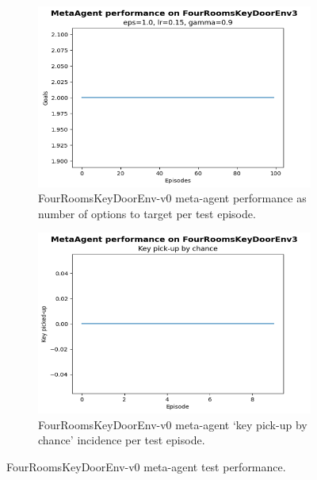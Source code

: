 \documentclass[conference]{IEEEtran}
\begin{document}
\begin{figure}[ht]
\centering
\begin{subfigure}[t]{0.45\columnwidth}
\centering
\includegraphics[width=1.0\textwidth]{img/exp_option_her_test_perf_small.png}
\caption{FourRoomsKeyDoorEnv-v0 meta-agent performance as number of options to target per test episode.}
\label{fig:exp_option_her_test_perf_small}
\end{subfigure}
\hspace{0em}
\begin{subfigure}[t]{0.45\columnwidth}
\centering
\includegraphics[width=1.0\textwidth]{img/exp_option_her_test_pick_small.png}
\caption{FourRoomsKeyDoorEnv-v0 meta-agent ‘key pick-up by chance’ incidence per test episode.}
\label{fig:exp_option_her_test_pick_small}
\end{subfigure}
\caption{FourRoomsKeyDoorEnv-v0 meta-agent test performance.}
\label{fig:exp_option_her_test_small}
\end{figure}
\end{document}
